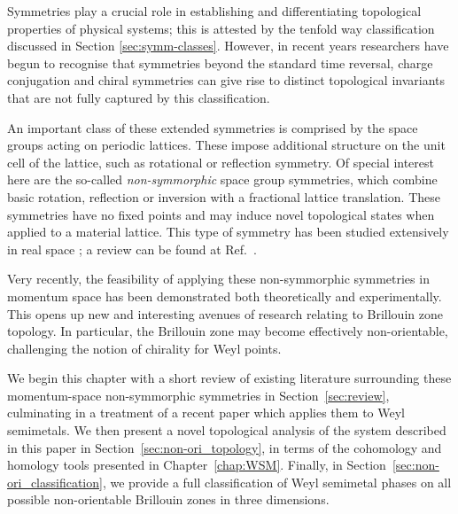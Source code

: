 \label{chap:non-orientable}

Symmetries play a crucial role in establishing and differentiating topological properties of physical systems; this is attested by the tenfold way classification discussed in Section \ref{sec:symm-classes}. However, in recent years researchers have begun to recognise that symmetries beyond the standard time reversal, charge conjugation and chiral symmetries can give rise to distinct topological invariants that are not fully captured by this classification.

An important class of these extended symmetries is comprised by the space groups acting on periodic lattices. These impose additional structure on the unit cell of the lattice, such as rotational or reflection symmetry. Of special interest here are the so-called \emph{non-symmorphic} space group symmetries, which combine basic rotation, reflection or inversion with a fractional lattice translation. These symmetries have no fixed points and may induce novel topological states when applied to a material lattice. This type of symmetry has been studied extensively in real space \cite{Wang_hourglass,Chen_nonsymmorphic-semimetal,Kim_glide-semimetal,Shiozaki_nonsymmorphic-topology,Bzdusek_nodal-chain,Wieder_layer-semimetal,Zhao_nonsymmorphic-semimetal,Yang_nonsymmorphic-semimetal,Wang_hourglass-semimetal,Wang_hourglass-Dirac,Wieder_wallpaper-fermions,Xiao_hourglass-Weyl}; a review can be found at Ref.~\cite{Zhang_nonsymmorphic-review}.

Very recently, the feasibility of applying these non-symmorphic symmetries in momentum space has been demonstrated both theoretically and experimentally. %
This opens up new and interesting avenues of research relating to Brillouin zone topology. In particular, the Brillouin zone may become effectively non-orientable, challenging the notion of chirality for Weyl points.

We begin this chapter with a short review of existing literature surrounding these momentum-space non-symmorphic symmetries in Section~\ref{sec:review}, culminating in a treatment of a recent paper which applies them to Weyl semimetals. We then present a novel topological analysis of the system described in this paper in Section~\ref{sec:non-ori_topology}, in terms of the cohomology and homology tools presented in Chapter~\ref{chap:WSM}. Finally, in Section~\ref{sec:non-ori_classification}, we provide a full classification of Weyl semimetal phases on all possible non-orientable Brillouin zones in three dimensions.


